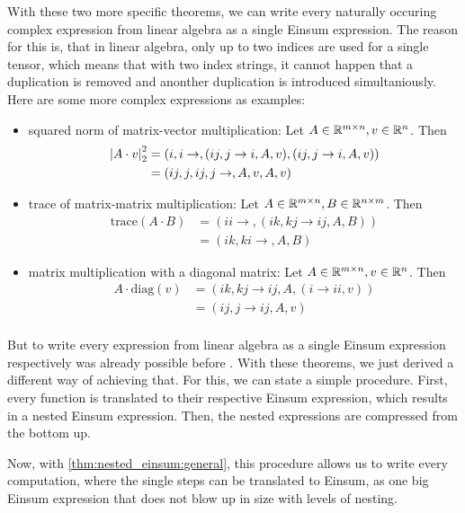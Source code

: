 

With these two more specific theorems, we can write every naturally occuring complex expression from linear algebra as a single Einsum expression.
The reason for this is, that in linear algebra, only up to two indices are used for a single tensor,
which means that with two index strings, it cannot happen that a duplication is removed and anonther duplication is introduced simultaniously.
Here are some more complex expressions as examples:
\begin{itemize}
    \item squared norm of matrix-vector multiplication: Let $A \in \mathbb{R}^{m \times n}, v \in \mathbb{R}^{n}$. Then
          \begin{align*}
              \left\lvert A \cdot v \right\rvert_2^2 & = (i,i\rightarrow,(ij, j \rightarrow i, A, v),(ij, j \rightarrow i, A, v)) \\
                                  & = (ij,j,ij,j\rightarrow,A,v,A,v)
          \end{align*}
    \item trace of matrix-matrix multiplication: Let $A \in \mathbb{R}^{m \times n}, B \in \mathbb{R}^{n \times m}$. Then
          \begin{align*}
              \text{trace}(A \cdot B) & = (ii \rightarrow, (ik, kj \rightarrow ij, A, B)) \\
                                      & = (ik, ki \rightarrow, A, B)
          \end{align*}
    \item matrix multiplication with a diagonal matrix: Let $A \in \mathbb{R}^{m \times n}, v \in \mathbb{R}^{n}$. Then
          \begin{align*}
              A \cdot \text{diag}(v) & = (ik, kj \rightarrow ij, A, (i \rightarrow ii, v)) \\
                                     & = (ij, j \rightarrow ij, A, v)                      \\
          \end{align*}
\end{itemize}

But to write every expression from linear algebra as a single Einsum expression respectively was already possible before \cite{Klaus2023}.
With these theorems, we just derived a different way of achieving that.
For this, we can state a simple procedure.
First, every function is translated to their respective Einsum expression, which results in a nested Einsum expression.
Then, the nested expressions are compressed from the bottom up.

Now, with \cref{thm:nested_einsum:general}, this procedure allows us to write every computation, where the single steps can be translated to Einsum, as one big Einsum expression that does not blow up in size with levels of nesting.